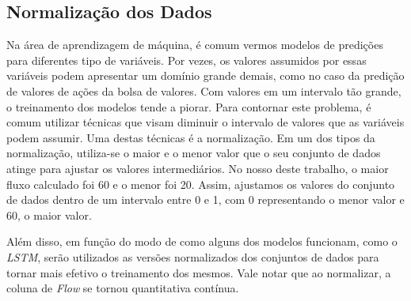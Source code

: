 \subsection{Normalização dos Dados}
Na área de aprendizagem de máquina, é comum vermos modelos de predições para diferentes tipo de variáveis. Por vezes, os valores assumidos por essas variáveis podem apresentar um domínio grande demais, como no caso da predição de valores de ações da bolsa de valores. Com valores em um intervalo tão grande, o treinamento dos modelos tende a piorar. Para contornar este problema, é comum utilizar técnicas que visam diminuir o intervalo de valores que as variáveis podem assumir. Uma destas técnicas é a normalização. Em um dos tipos da normalização, utiliza-se o maior e o menor valor que o seu conjunto de dados atinge para ajustar os valores intermediários. No nosso deste trabalho, o maior fluxo calculado foi 60 e o menor foi 20. Assim, ajustamos os valores do conjunto de dados dentro de um intervalo entre 0 e 1, com 0 representando o menor valor e 60, o maior valor. 

Além disso, em função do modo de como alguns dos modelos funcionam, como o \textit{\acrshort{LSTM}}, serão utilizados as versões normalizados dos conjuntos de dados para tornar mais efetivo o treinamento dos mesmos. Vale notar que ao normalizar, a coluna de \textit{Flow} se tornou quantitativa contínua.

